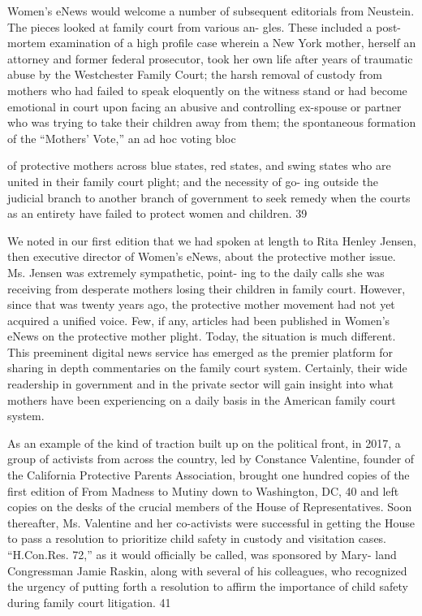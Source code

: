 Women’s eNews would welcome a number of subsequent editorials
from Neustein. The pieces looked at family court from various an-
gles. These included a post-mortem examination of a high profile case
wherein a New York mother, herself an attorney and former federal
prosecutor, took her own life after years of traumatic abuse by the
Westchester Family Court; the harsh removal of custody from mothers
who had failed to speak eloquently on the witness stand or had become
emotional in court upon facing an abusive and controlling ex-spouse
or partner who was trying to take their children away from them; the
spontaneous formation of the “Mothers’ Vote,” an ad hoc voting bloc


of protective mothers across blue states, red states, and swing states
who are united in their family court plight; and the necessity of go-
ing outside the judicial branch to another branch of government to seek
remedy when the courts as an entirety have failed to protect women and
children. 39 \pfl{}


We noted in our first edition that we had spoken at length to Rita
Henley Jensen, then executive director of Women’s eNews, about the
protective mother issue. Ms. Jensen was extremely sympathetic, point-
ing to the daily calls she was receiving from desperate mothers losing
their children in family court. However, since that was twenty years
ago, the protective mother movement had not yet acquired a unified
voice. Few, if any, articles had been published in Women’s eNews on
the protective mother plight. Today, the situation is much different. This
preeminent digital news service has emerged as the premier platform for
sharing in depth commentaries on the family court system. Certainly,
their wide readership in government and in the private sector will gain
insight into what mothers have been experiencing on a daily basis in the
American family court system. \pfl{}




As an example of the kind of traction built up on the political front,
in 2017, a group of activists from across the country, led by Constance
Valentine, founder of the California Protective Parents Association,
brought one hundred copies of the first edition of From Madness to
Mutiny down to Washington, DC, 40 and left copies on the desks of the
crucial members of the House of Representatives. Soon thereafter, Ms.
Valentine and her co-activists were successful in getting the House to
pass a resolution to prioritize child safety in custody and visitation cases.
“H.Con.Res. 72,” as it would officially be called, was sponsored by Mary-
land Congressman Jamie Raskin, along with several of his colleagues,
who recognized the urgency of putting forth a resolution to affirm the
importance of child safety during family court litigation. 41 \pfl{}

